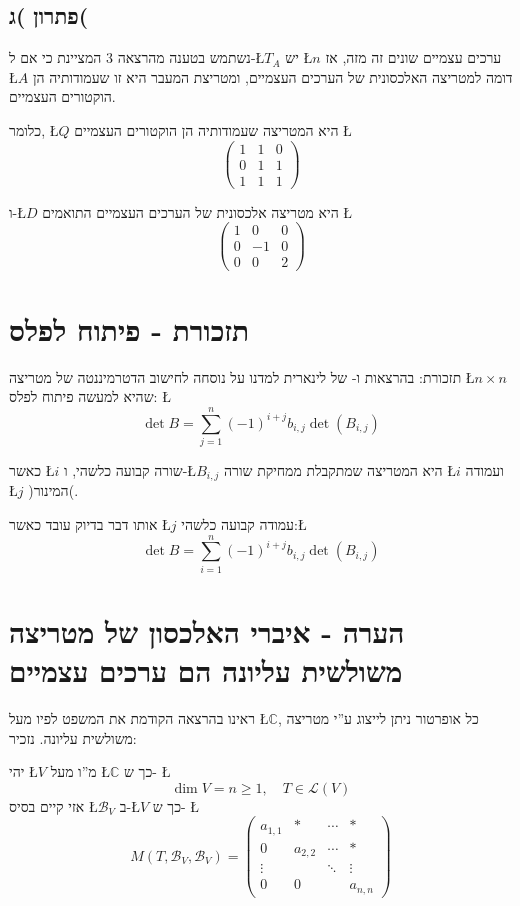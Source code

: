 \documentclass[english,hebrew]{article}
\begin{document}
\subsection{פתרון )ג(}

נשתמש בטענה מהרצאה 3 המציינת כי אם ל-\L{$T_{A}$} יש \L{$n$} ערכים
עצמיים שונים זה מזה, אז \L{$A$} דומה למטריצה האלכסונית של הערכים
העצמיים, ומטריצת המעבר היא זו שעמודותיה הן הוקטורים העצמיים.

כלומר, \L{$Q$} היא המטריצה שעמודותיה הן הוקטורים העצמיים \L{%
\[
\begin{pmatrix}1 & 1 & 0\\
0 & 1 & 1\\
1 & 1 & 1
\end{pmatrix}
\]
}%

ו-\L{$D$} היא מטריצה אלכסונית של הערכים העצמיים התואמים \L{%
\[
\begin{pmatrix}1 & 0 & 0\\
0 & -1 & 0\\
0 & 0 & 2
\end{pmatrix}
\]
}%

\section{תזכורת - פיתוח לפלס}

תזכורת: בהרצאות {\endL} ו-{\endL} של לינארית {\endL}
למדנו על נוסחה לחישוב הדטרמיננטה של מטריצה \L{$n\times n$} שהיא למעשה
פיתוח לפלס: \L{%
\[
\det B=\underset{j=1}{\overset{n}{\sum}}\left(-1\right)^{i+j}b_{i,j}\det\left(B_{i,j}\right)
\]
}%

כאשר \L{$i$} שורה קבועה כלשהי, ו-\L{$B_{i,j}$} היא המטריצה שמתקבלת
ממחיקת שורה \L{$i$} ועמודה \L{$j$} )המינור(.

אותו דבר בדיוק עובד כאשר \L{$j$} עמודה קבועה כלשהי:\L{%
\[
\det B=\underset{i=1}{\overset{n}{\sum}}\left(-1\right)^{i+j}b_{i,j}\det\left(B_{i,j}\right)
\]
}%

\section{הערה - איברי האלכסון של מטריצה משולשית עליונה הם ערכים עצמיים}

ראינו בהרצאה הקודמת את המשפט לפיו מעל \L{$\mathbb{C}$}, כל אופרטור
ניתן לייצוג ע\textquotedblright י מטריצה משולשית עליונה. נזכיר:

יהי \L{$V$} מ\textquotedblright ו מעל \L{$\mathbb{C}$} כך ש- \L{%
\[
\dim V=n\geq1,\quad T\in\mathcal{L}\left(V\right)
\]
}%
אזי קיים בסיס \L{$\mathcal{B}_{V}$} ב-\L{$V$} כך ש- \L{%
\[
M\left(T,\mathcal{B}_{V},\mathcal{B}_{V}\right)=\begin{pmatrix}a_{1,1} & * & \cdots & *\\
0 & a_{2,2} & \cdots & *\\
\vdots &  & \ddots & \vdots\\
0 & 0 &  & a_{n,n}
\end{pmatrix}
\]
}%
\end{document}
